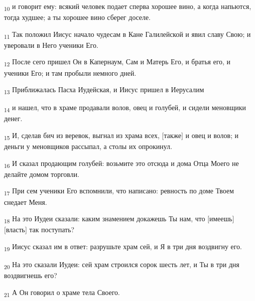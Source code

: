 \begin{tcolorbox}
\textsubscript{10} и говорит ему: всякий человек подает сперва хорошее вино, а когда напьются, тогда худшее; а ты хорошее вино сберег доселе.
\end{tcolorbox}
\begin{tcolorbox}
\textsubscript{11} Так положил Иисус начало чудесам в Кане Галилейской и явил славу Свою; и уверовали в Него ученики Его.
\end{tcolorbox}
\begin{tcolorbox}
\textsubscript{12} После сего пришел Он в Капернаум, Сам и Матерь Его, и братья его, и ученики Его; и там пробыли немного дней.
\end{tcolorbox}
\begin{tcolorbox}
\textsubscript{13} Приближалась Пасха Иудейская, и Иисус пришел в Иерусалим
\end{tcolorbox}
\begin{tcolorbox}
\textsubscript{14} и нашел, что в храме продавали волов, овец и голубей, и сидели меновщики денег.
\end{tcolorbox}
\begin{tcolorbox}
\textsubscript{15} И, сделав бич из веревок, выгнал из храма всех, [также] и овец и волов; и деньги у меновщиков рассыпал, а столы их опрокинул.
\end{tcolorbox}
\begin{tcolorbox}
\textsubscript{16} И сказал продающим голубей: возьмите это отсюда и дома Отца Моего не делайте домом торговли.
\end{tcolorbox}
\begin{tcolorbox}
\textsubscript{17} При сем ученики Его вспомнили, что написано: ревность по доме Твоем снедает Меня.
\end{tcolorbox}
\begin{tcolorbox}
\textsubscript{18} На это Иудеи сказали: каким знамением докажешь Ты нам, что [имеешь] [власть] так поступать?
\end{tcolorbox}
\begin{tcolorbox}
\textsubscript{19} Иисус сказал им в ответ: разрушьте храм сей, и Я в три дня воздвигну его.
\end{tcolorbox}
\begin{tcolorbox}
\textsubscript{20} На это сказали Иудеи: сей храм строился сорок шесть лет, и Ты в три дня воздвигнешь его?
\end{tcolorbox}
\begin{tcolorbox}
\textsubscript{21} А Он говорил о храме тела Своего.
\end{tcolorbox}
